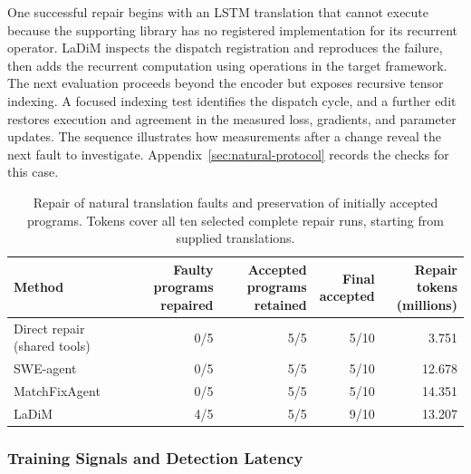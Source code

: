 \documentclass{article}
\newcommand{\thead}[1]{\textbf{\shortstack[b]{#1}}}
\begin{document}
One successful repair begins with an LSTM translation that cannot execute because the supporting library has no registered implementation for its recurrent operator. LaDiM inspects the dispatch registration and reproduces the failure, then adds the recurrent computation using operations in the target framework. The next evaluation proceeds beyond the encoder but exposes recursive tensor indexing. A focused indexing test identifies the dispatch cycle, and a further edit restores execution and agreement in the measured loss, gradients, and parameter updates. The sequence illustrates how measurements after a change reveal the next fault to investigate. Appendix~\ref{sec:natural-protocol} records the checks for this case.

\begin{table}[!htb]
\caption{Repair of natural translation faults and preservation of initially accepted programs. Tokens cover all ten selected complete repair runs, starting from supplied translations.}
\label{tab:natural-repairs}
\centering
\small
\setlength{\tabcolsep}{4pt}

\begin{tabular*}{\linewidth}{@{\extracolsep{\fill}}lrrrr@{}}
\toprule
\textbf{Method} & \thead{Faulty\\programs repaired} & \thead{Accepted programs\\retained} & \thead{Final\\accepted} & \thead{Repair tokens\\(millions)} \\
\midrule
Direct repair (shared tools) & 0/5 & 5/5 & 5/10 & 3.751 \\
SWE-agent & 0/5 & 5/5 & 5/10 & 12.678 \\
MatchFixAgent & 0/5 & 5/5 & 5/10 & 14.351 \\
LaDiM & 4/5 & 5/5 & 9/10 & 13.207 \\
\bottomrule
\end{tabular*}


\end{table}

\subsubsection{Training Signals and Detection Latency}
\end{document}

